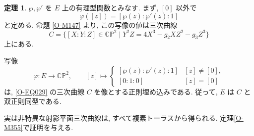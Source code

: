 \documentclass[dvipdfmx,a4paper,11pt]{article} %
\newcommand{\C}{\mathbb{C}}
\theoremstyle{definition}
\newtheorem{thm}{定理}[section]
\numberwithin{equation}{section}
\begin{document}
\begin{thm}\label{O-M149}
$\wp,\wp'$ を $E$ 上の有理型関数とみなす.
まず, $[0]$ 以外で
\[
\varphi([z])=[\wp(z):\wp'(z):1]
\]
と定める.
命題 \ref{O-M147} より, この写像の値は三次曲線
\begin{equation}\label{O-EQ029}
C=\{[X:Y:Z]\in\C\mathbb P^2
\mid Y^2Z=4X^3-g_2XZ^2-g_3Z^3\}
\end{equation}
上にある.


写像
\[
\varphi:E\longrightarrow\C\mathbb P^2,\qquad
[z]\longmapsto
\begin{cases}
[\wp(z):\wp'(z):1] & [z]\neq[0],\\
{}[0:1:0] & [z]=[0]
\end{cases}
\]
は, \eqref{O-EQ029} の三次曲線 $C$ を像とする正則埋め込みである.
従って, $E$ は $C$ と双正則同型である.
\end{thm}
実は非特異な射影平面三次曲線は, すべて複素トーラスから得られる. 定理\ref{O-M355}で証明を与える. 
\end{document}
